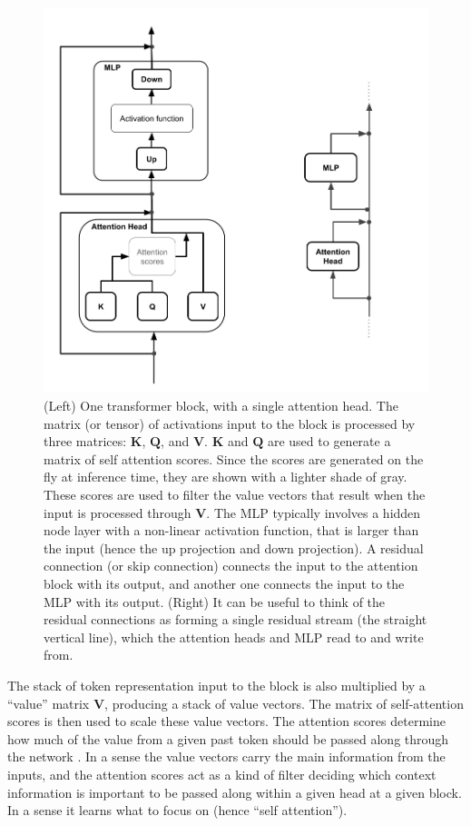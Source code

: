 \begin{figure}[ht]
\centering
\includegraphics[scale=.25]{./images/transformerBlockResidualStream.png}
\caption[Jeff Yoshimi and Pierre Beckman, with consultation from Tim Meyer.]{(Left) One transformer
block, with a single attention head. The matrix (or tensor) of activations input to
the block is processed by three matrices: $\textbf{K}$, $\textbf{Q}$, and
$\textbf{V}$.  $\textbf{K}$ and $\textbf{Q}$ are used to generate a
matrix of self attention scores. Since the scores are generated on the fly at inference time, they are shown with a lighter shade of gray. These scores are used to filter the value vectors that result when the input is processed through $\textbf{V}$. The MLP
typically involves a hidden node layer with a non-linear activation function, that is larger than the input (hence the up
projection and down projection). A residual connection (or skip connection) connects the input to the attention block with its output, and another one connects the input to the MLP with its output. (Right) It can be useful to think of the residual connections as forming a single residual stream (the straight vertical line), which the attention heads and MLP read to and write from.}
\label{transformerBlockSimple}
\end{figure}

The stack of token representation input to the block is also multiplied by a ``value'' matrix $\textbf{V}$, producing a stack of value vectors. The matrix of self-attention scores is then used to scale these value vectors. The attention scores determine how much of the value from a given past token should be passed along through the network \cite{beckmann2025mechanistic}. In a sense the value vectors carry the main information from the inputs, and the attention scores act as a kind of filter deciding which context information is important to be passed along within a given head at a given block. In a sense it learns what to focus on (hence ``self attention'').

